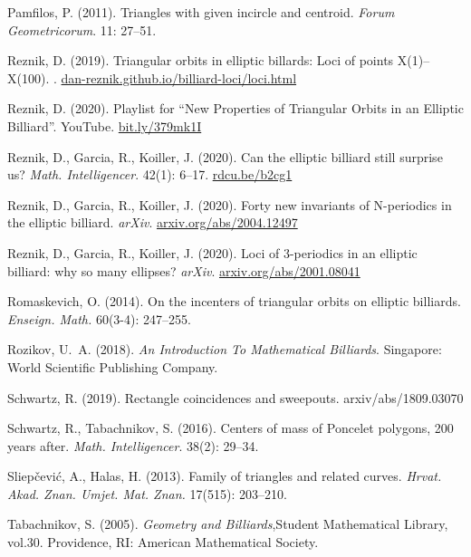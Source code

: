 \documentclass{article}
\theoremstyle{definition}
\begin{document}
\begin{thebibliography}{10}
Pamfilos, P. (2011).
\newblock Triangles with given incircle and centroid.
\newblock \emph{Forum Geometricorum}. 11: 27--51.

Reznik, D. (2019).
\newblock Triangular orbits in elliptic billards: Loci of points {X(1)--X(100)}.
.
\newblock \url{dan-reznik.github.io/billiard-loci/loci.html}

Reznik, D. (2020).
\newblock Playlist for {``New Properties of Triangular Orbits in an Elliptic
  Billiard''}.
\newblock YouTube.
\newblock \url{bit.ly/379mk1I}

Reznik, D., Garcia, R., Koiller, J. (2020).
\newblock Can the elliptic billiard still surprise us?
\newblock \emph{Math. Intelligencer}. 42(1): 6--17.
\newblock \url{rdcu.be/b2cg1}

Reznik, D., Garcia, R., Koiller, J. (2020).
\newblock Forty new invariants of {N}-periodics in the elliptic billiard.
\newblock \emph{arXiv}.
\newblock \url{arxiv.org/abs/2004.12497}

Reznik, D., Garcia, R., Koiller, J. (2020).
\newblock Loci of 3-periodics in an elliptic billiard: why so many ellipses?
\newblock \emph{arXiv}.
\newblock \url{arxiv.org/abs/2001.08041}

Romaskevich, O. (2014).
\newblock On the incenters of triangular orbits on elliptic billiards.
\newblock \emph{Enseign. Math.} 60(3-4): 247--255.

Rozikov, U.~A. (2018).
\newblock \emph{An Introduction To Mathematical Billiards}.
\newblock Singapore: World Scientific Publishing Company.

Schwartz, R. (2019).
\newblock Rectangle coincidences and sweepouts.
\newblock arxiv/abs/1809.03070

Schwartz, R., Tabachnikov, S. (2016).
\newblock Centers of mass of {P}oncelet polygons, 200 years after.
\newblock \emph{Math. Intelligencer}. 38(2): 29--34.

Sliep\v{c}evi\'c, A., Halas, H. (2013).
\newblock Family of triangles and related curves.
\newblock \emph{
Hrvat. Akad. Znan. Umjet. Mat. Znan.} 17(515): 203--210.

Tabachnikov, S. (2005).
\newblock \emph{Geometry and Billiards},Student Mathematical
  Library, vol.30.
\newblock Providence, RI: American Mathematical Society.


\end{thebibliography}
\end{document}

